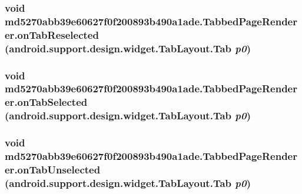 \hypertarget{classmd5270abb39e60627f0f200893b490a1ade_1_1_tabbed_page_renderer_2f19345d253dcfa7a6ad6abbaf641e8a}{
\subsubsection[{onTabReselected}]{\setlength{\rightskip}{0pt plus 5cm}void md5270abb39e60627f0f200893b490a1ade.TabbedPageRenderer.onTabReselected (android.support.design.widget.TabLayout.Tab {\em p0})}}
\label{classmd5270abb39e60627f0f200893b490a1ade_1_1_tabbed_page_renderer_2f19345d253dcfa7a6ad6abbaf641e8a}


\hypertarget{classmd5270abb39e60627f0f200893b490a1ade_1_1_tabbed_page_renderer_b3b382046f76dcb461f46c32f878ce21}{
\subsubsection[{onTabSelected}]{\setlength{\rightskip}{0pt plus 5cm}void md5270abb39e60627f0f200893b490a1ade.TabbedPageRenderer.onTabSelected (android.support.design.widget.TabLayout.Tab {\em p0})}}
\label{classmd5270abb39e60627f0f200893b490a1ade_1_1_tabbed_page_renderer_b3b382046f76dcb461f46c32f878ce21}


\hypertarget{classmd5270abb39e60627f0f200893b490a1ade_1_1_tabbed_page_renderer_34344ed4429e52347801b12b7a69da61}{
\subsubsection[{onTabUnselected}]{\setlength{\rightskip}{0pt plus 5cm}void md5270abb39e60627f0f200893b490a1ade.TabbedPageRenderer.onTabUnselected (android.support.design.widget.TabLayout.Tab {\em p0})}}
\label{classmd5270abb39e60627f0f200893b490a1ade_1_1_tabbed_page_renderer_34344ed4429e52347801b12b7a69da61}




